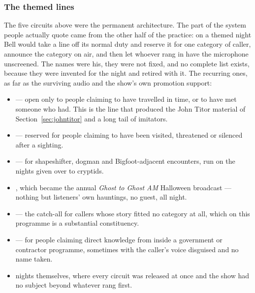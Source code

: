 \subsubsection{The themed lines}

The five circuits above were the permanent architecture. The part of the system people actually
quote came from the other half of the practice: on a themed night Bell would take a line off its
normal duty and reserve it for one category of caller, announce the category on air, and then let
whoever rang in have the microphone unscreened. The names were his, they were not fixed, and no
complete list exists, because they were invented for the night and retired with it. The recurring
ones, as far as the surviving audio and the show's own promotion support:

\begin{itemize}
  \item {} --- open only to people claiming to have travelled in time,
        or to have met someone who had. This is the line that produced the John Titor material of
        Section~\ref{sec:johntitor} and a long tail of imitators.
  \item {} --- reserved for people claiming to have been visited,
        threatened or silenced after a sighting.
  \item {} --- for shapeshifter, dogman and Bigfoot-adjacent encounters, run
        on the nights given over to cryptids.
  \item {}, which became the annual \emph{Ghost to Ghost AM} Halloween broadcast
        --- nothing but listeners' own hauntings, no guest, all night.
  \item {} --- the catch-all for callers whose story fitted no
        category at all, which on this programme is a substantial constituency.
  \item {} --- for people claiming direct knowledge from inside
        a government or contractor programme, sometimes with the caller's voice disguised and no
        name taken.
  \item {} nights themselves, where every circuit was released at once and the
        show had no subject beyond whatever rang first.
\end{itemize}

